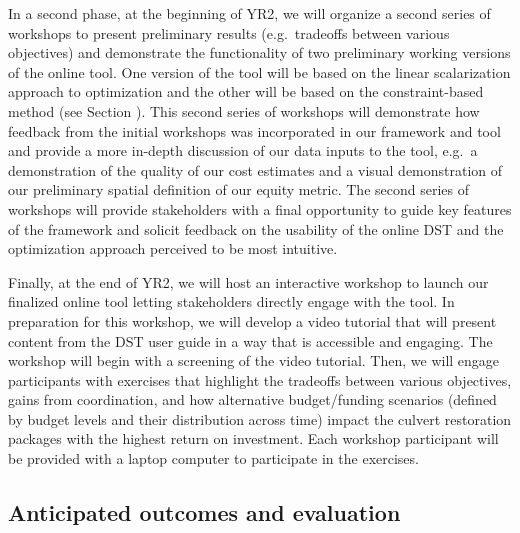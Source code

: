 \documentclass[12pt]{elsarticle}
\begin{document}
In a second phase, at the beginning of YR2, we will organize a second series of workshops to present preliminary results (e.g.\ tradeoffs between various objectives) and demonstrate the functionality of two preliminary working versions of the online tool. One version of the tool will be based on the linear scalarization approach to optimization and the other will be based on the constraint-based method (see Section \label{sec:opt}). This second series of workshops will demonstrate how feedback from the initial workshops was incorporated in our framework and tool and provide a more in-depth discussion of our data inputs to the tool, e.g.\ a demonstration of the quality of our cost estimates and a visual demonstration of our preliminary spatial definition of our equity metric. The second series of workshops will provide stakeholders with a final opportunity to guide key features of the framework and solicit feedback on the usability of the online DST and the optimization approach perceived to be most intuitive. 

Finally, at the end of YR2, we will host an interactive workshop to launch our finalized online tool letting stakeholders directly engage with the tool. In preparation for this workshop, we will develop a video tutorial that will present content from the DST user guide in a way that is accessible and engaging. The workshop will begin with a screening of the video tutorial. Then, we will engage participants with exercises that highlight the tradeoffs between various objectives, gains from coordination, and how alternative budget/funding scenarios (defined by budget levels and their distribution across time) impact the culvert restoration packages with the highest return on investment. Each workshop participant will be provided with a laptop computer to participate in the exercises. 

\subsection{Anticipated outcomes and evaluation}
\end{document}
